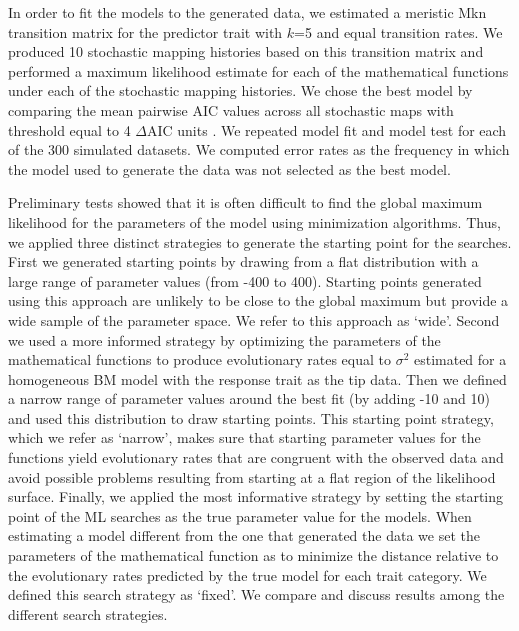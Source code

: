 In order to fit the models to the generated data, we estimated a meristic Mkn transition matrix for the predictor trait with $\mathit{k}$=5 and equal transition rates. We produced 10 stochastic mapping histories based on this transition matrix and performed a maximum likelihood estimate for each of the mathematical functions under each of the stochastic mapping histories. We chose the best model by comparing the mean pairwise AIC values across all stochastic maps with threshold equal to 4 $\Delta$AIC units \citep{burnham_model_2003}. We repeated model fit and model test for each of the 300 simulated datasets. We computed error rates as the frequency in which the model used to generate the data was not selected as the best model.

Preliminary tests showed that it is often difficult to find the global maximum likelihood for the parameters of the model using minimization algorithms. Thus, we applied three distinct strategies to generate the starting point for the searches. First we generated starting points by drawing from a flat distribution with a large range of parameter values (from -400 to 400). Starting points generated using this approach are unlikely to be close to the global maximum but provide a wide sample of the parameter space. We refer to this approach as `wide'. Second we used a more informed strategy by optimizing the parameters of the mathematical functions to produce evolutionary rates equal to $\sigma^{2}$ estimated for a homogeneous BM model with the response trait as the tip data. Then we defined a narrow range of parameter values around the best fit (by adding -10 and 10) and used this distribution to draw starting points. This starting point strategy, which we refer as `narrow', makes sure that starting parameter values for the functions yield evolutionary rates that are congruent with the observed data and avoid possible problems resulting from starting at a flat region of the likelihood surface. Finally, we applied the most informative strategy by setting the starting point of the ML searches as the true parameter value for the models. When estimating a model different from the one that generated the data we set the parameters of the mathematical function as to minimize the distance relative to the evolutionary rates predicted by the true model for each trait category. We defined this search strategy as `fixed'. We compare and discuss results among the different search strategies.


